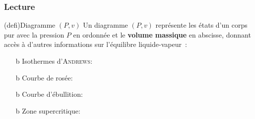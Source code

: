 \documentclass[../../main/main.tex]{subfiles}
\begin{document}
\subsubsection{Lecture}
\begin{tcb*}(defi){Diagramme $(P,v)$}
	Un diagramme $(P,v)$ représente les états d'un corps pur avec la pression $P$
	en ordonnée et le \textbf{volume massique} en abscisse, donnant accès à
	d'autres informations sur l'équilibre liquide-vapeur~:
	\begin{isd}
		\begin{itemize}
			\item[b]{Isothermes d'\textsc{Andrews}}:
			\item[b]{Courbe de rosée}:
			\item[b]{Courbe d'ébullition}:
			\item[b]{Zone supercritique}:
		\end{itemize}
		\tcblower
		\begin{center}
\end{center}
\end{isd}
\end{tcb*}
\end{document}
